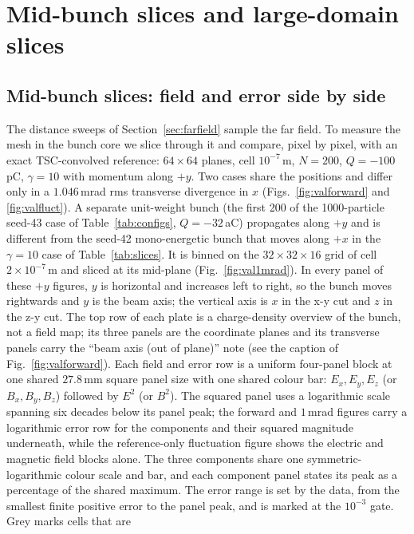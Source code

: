 \section{Mid-bunch slices and large-domain slices}
\label{app:slices}

\subsection{Mid-bunch slices: field and error side by side}
\label{app:slices-mid}

The distance sweeps of Section~\ref{sec:farfield} sample the far field. To
measure the mesh in the bunch core we slice through it and compare, pixel
by pixel, with an exact TSC-convolved reference: $64\times64$ planes, cell
$10^{-7}$\,m, $N=200$, $Q=-100$\,pC, $\gamma=10$ with momentum along $+y$.
Two cases share the positions and differ only in a $1.046$\,mrad rms
transverse divergence in $x$ (Figs.~\ref{fig:valforward} and
\ref{fig:valfluct}). A
separate unit-weight bunch (the first 200 of the 1000-particle seed-43 case
of Table~\ref{tab:configs}, $Q=-32$\,aC) propagates along $+y$ and is
different from the seed-42 mono-energetic bunch that moves along $+x$ in
the $\gamma=10$ case of Table~\ref{tab:slices}. It is binned on the
$32\times32\times16$ grid of cell $2\times10^{-7}$\,m and sliced at its
mid-plane (Fig.~\ref{fig:val1mrad}). In every panel of these $+y$ figures, $y$ is
horizontal and increases left to right, so the bunch moves rightwards and $y$
is the beam axis; the vertical axis is $x$ in the x-y cut and $z$ in the z-y
cut. The top row of each plate is a charge-density overview of the bunch, not
a field map; its three panels are the coordinate planes and its transverse
panels carry the ``beam axis (out of plane)'' note (see the caption of
Fig.~\ref{fig:valforward}). Each field and error row is a uniform four-panel
block at one shared $27.8$\,mm square panel size with one shared colour bar:
$E_x,E_y,E_z$ (or $B_x,B_y,B_z$) followed by $E^2$ (or $B^2$). The squared
panel uses a logarithmic scale spanning six decades below its panel peak; the
forward and $1$\,mrad figures carry a logarithmic error row for the
components and their squared magnitude underneath, while the reference-only
fluctuation figure shows the electric and magnetic field blocks alone. The
three components share one symmetric-logarithmic colour scale and bar, and
each component panel states its peak as a percentage of the shared maximum.
The error range is set by the data, from the smallest finite positive error to
the panel peak, and is marked at the $10^{-3}$ gate. Grey marks cells that are
